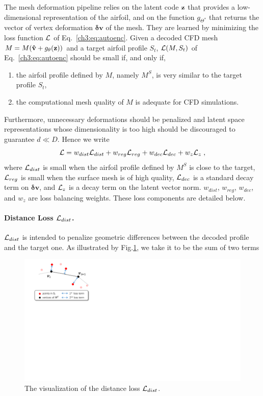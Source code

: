 The mesh deformation pipeline relies on the latent code $\mathbf{z}$ that provides a low-dimensional representation of the airfoil, and on the function $g_{\Theta^*}$ that returns the vector of vertex deformation $\mathbf{\delta v}$ of the mesh. They are learned by minimizing the loss function $\mathcal{L}$ of  Eq.~\ref{ch3:eq:autoenc}. Given a decoded CFD mesh $M=M(\mathbf{\hat{v}} +g_{\theta}(\mathbf{z}))$ and a target airfoil profile $S_t$, $\mathcal{L}(M,S_t)$ of Eq.~\ref{ch3:eq:autoenc} should be small if, and only if, 
%
\begin{enumerate}

    \item the airfoil profile defined by $M$, namely $M^S$, is very similar to the target profile $S_t$,
    
    \item the computational mesh quality of $M$ is adequate for CFD simulations.
    
\end{enumerate}
%
Furthermore, unnecessary deformations should be penalized and latent space representations whose dimensionality is too high should be discouraged to guarantee $d \ll D$. Hence we write
%
\begin{equation}
    \mathcal{L} = w_{dist}\mathcal{L}_{dist} + w_{reg}\mathcal{L}_{reg} + w_{dec} \mathcal{L}_{dec} + w_{z} \mathcal{L}_{z} \;,
    \label{ch3:eq:totLoss}
\end{equation}
%
where $\mathcal{L}_{dist}$ is small when the airfoil profile defined by $M^S$ is close to the target, $\mathcal{L}_{reg}$ is small when the surface mesh is of high quality, $\mathcal{L}_{dec}$ is a standard decay term on $\mathbf{\delta v}$, and $\mathcal{L}_{z}$ is a decay term on the latent vector norm. $w_{dist}$, $w_{reg}$, $w_{dec}$, and $w_{z}$ are loss balancing weights. These loss components are detailed below. 

\paragraph{Distance Loss $\mathcal{L}_{dist}$.} 

$\mathcal{L}_{dist}$ is intended to penalize geometric differences between the decoded profile and the target one. As illustrated by Fig.\ref{ch3:fig:loss_dist}, we take it to be the sum of two terms
%
\begin{figure}[!htb]
	\begin{center}
		\includegraphics[width=0.5\linewidth]{chapter3/tex/figures/loss_dist.pdf}
	\end{center}
	\caption{
		\small The visualization of the distance loss $\mathcal{L}_{dist}$.
	}
	\label{ch3:fig:loss_dist}
\end{figure}

